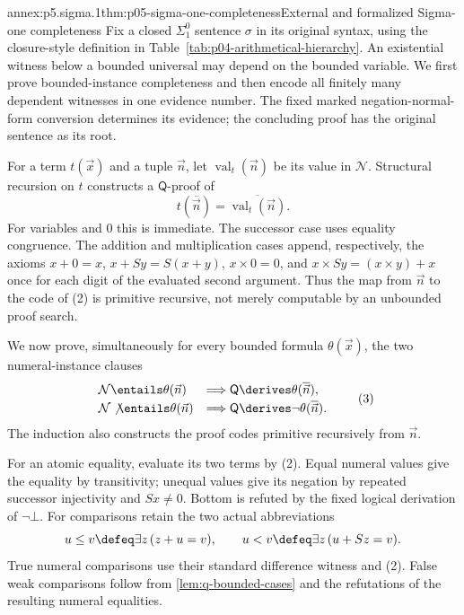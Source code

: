 \begin{annexitem}{annex:p5.sigma.1}{thm:p05-sigma-one-completeness}{External and formalized Sigma-one completeness}
Fix a closed \(\Sigma^0_1\) sentence \(\sigma\) in its original syntax,
using the closure-style definition in
Table~\ref{tab:p04-arithmetical-hierarchy}. An existential witness below a
bounded universal may depend on the bounded variable. We first prove
bounded-instance completeness and then encode all finitely many dependent
witnesses in one evidence number. The fixed marked negation-normal-form
conversion determines its evidence; the concluding proof has the original
sentence as its root.

For a term \(t(\vec x)\) and a tuple \(\vec n\), let
\(\operatorname{val}_t(\vec n)\) be its value in \(\mathcal N\).
Structural recursion on \(t\) constructs a \(\mathsf Q\)-proof of
\[
 t(\overline{\vec n})=
 \overline{\operatorname{val}_t(\vec n)}.                            \tag{2}
\]
For variables and \(0\) this is immediate.  The successor case uses equality
congruence.  The addition and multiplication cases append, respectively, the
axioms \(x+0=x\), \(x+Sy=S(x+y)\), \(x\times0=0\), and
\(x\times Sy=(x\times y)+x\) once for each digit of the evaluated second
argument.  Thus the map from \(\vec n\) to the code of (2) is primitive
recursive, not merely computable by an unbounded proof search.

We now prove, simultaneously for every bounded formula
\(\theta(\vec x)\), the two numeral-instance clauses
\[
\begin{array}{ll}
 \mathcal N\entails\theta(\vec n)
   &\Longrightarrow
   \mathsf Q\derives\theta(\overline{\vec n}),\\[2pt]
 \mathcal N\not\entails\theta(\vec n)
   &\Longrightarrow
   \mathsf Q\derives\neg\theta(\overline{\vec n}).
\end{array}                                                           \tag{3}
\]
The induction also constructs the proof codes primitive recursively from
\(\vec n\).

For an atomic equality, evaluate its two terms by (2).  Equal numeral values
give the equality by transitivity; unequal values give its negation by repeated
successor injectivity and \(Sx\ne0\). Bottom is refuted by the fixed
logical derivation of \(\neg\bot\). For comparisons retain the two actual
abbreviations
\[
 u\leq v\defeq\exists z\,(z+u=v),\qquad
 u<v\defeq\exists z\,(u+Sz=v).
\]
True numeral comparisons use their standard difference witness and (2).
False weak comparisons follow from \cref{lem:q-bounded-cases} and
the refutations of the resulting numeral equalities.


\end{annexitem}
